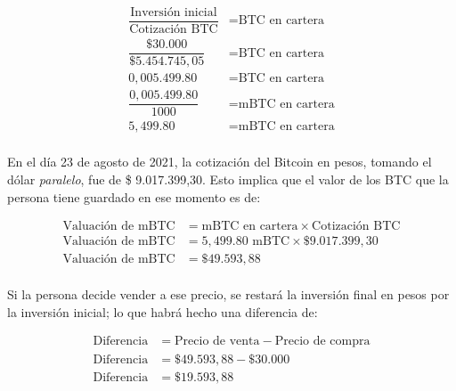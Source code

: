\documentclass[12pt,a4paper,twoside]{book}
\begin{document}
\begin{align*}
\dfrac{\text{Inversión inicial}}{\text{Cotización BTC}} &= \text{BTC en cartera} \\
\dfrac{\text{\$ } 30.000}{\text{\$ } 5.454.745,05} &= \text{BTC en cartera} \\
0,005.499.80 &= \text{BTC en cartera} \\
\dfrac{0,005.499.80}{1000} &= \text{mBTC en cartera} \\
5,499.80 &= \text{mBTC en cartera} \\
\end{align*}

En el día 23 de agosto de 2021, la cotización del Bitcoin en pesos, tomando el dólar \textit{paralelo}, fue de \$ 9.017.399,30. Esto implica que el valor de los BTC que la persona tiene guardado en ese momento es de:

\begin{align*}
\text{Valuación de mBTC} &= \text{mBTC en cartera} \times \text{Cotización BTC} \\
\text{Valuación de mBTC} &= 5,499.80 \text{ mBTC} \times \text{\$ } 9.017.399,30 \\
\text{Valuación de mBTC} &= \text{\$ } 49.593,88 \\
\end{align*}

Si la persona decide vender a ese precio, se restará la inversión final en pesos por la inversión inicial; lo que habrá hecho una diferencia de:

\begin{align*}
\text{Diferencia} &= \text{Precio de venta} - \text{Precio de compra} \\
\text{Diferencia} &= \text{\$ } 49.593,88 - \text{\$ } 30.000 \\
\text{Diferencia} &= \text{\$ } 19.593,88
\end{align*}
\end{document}
